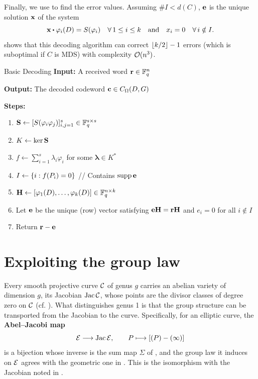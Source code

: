 \documentclass[twocolumn, 11pt]{scrartcl}
\begin{document}
Finally, we use \cite[Prop.~6.1]{o2008key} to find the error values. Assuming $\#I<d(C)$, $\mathbf{e}$ is the unique solution $\mathbf{x}$ of the system
\[ \bfx\dotpr \varphi_i(D)=S(\varphi_i)\quad\forall 1\leq i\leq k\qand x_i=0\quad\forall i\notin I. \]
\cite[Prop.~6.5]{o2008key} shows that this decoding algorithm can correct $\lfloor k/2\rfloor-1$ errors (which is suboptimal if $C$ is MDS) with complexity $\mathcal{O}(n^3)$.

\begin{algorithm}{Basic Decoding \cite[\S6.2]{hoholdt1998algebraic}}{}
    \textbf{Input:} A received word $\mathbf{r}\in\mathbb{F}_q^n$
    
    \textbf{Output:} The decoded codeword $\mathbf{c}\in C_\Omega(D,G)$
    
    \textbf{Steps:}
    
    \begin{enumerate}[label={\arabic*.}, left=0pt]
        \item $\mathbf{S}\gets[S(\varphi_i\varphi_j)]_{i,j=1}^s\in\mathbb{F}_q^{s\times s}$
        \item $K\gets\ker\mathbf{S}$ \quad
        \item $f\gets\sum_{i=1}^s \lambda_i\varphi_i$ for some $\bm\lambda\in K^*$
        \item $I\gets\{i:f(P_i)=0\}$ \quad // Contains $\operatorname{supp}\mathbf{e}$
        \item $\mathbf{H}\gets[\varphi_1(D),\hdots,\varphi_k(D)]\in\mathbb{F}_q^{n\times k}$
        \item Let $\mathbf{e}$ be the unique (row) vector satisfying $\mathbf{e}\mathbf{H}=\mathbf{r}\mathbf{H}$ and $e_i=0$ for all $i\notin I$
        \item Return $\mathbf{r}-\mathbf{e}$
    \end{enumerate}
\end{algorithm}

\section{Exploiting the group law} \label{section:group-law}

Every smooth projective curve $\mathcal{C}$ of genus $g$ carries an abelian variety of dimension $g$, its Jacobian $\operatorname{Jac}\mathcal{C}$, whose points are the divisor classes of degree zero on $\mathcal{C}$ (cf. ). What distinguishes genus 1 is that the group structure can be transported from the Jacobian to the curve. Specifically, for an elliptic curve, the \textbf{Abel--Jacobi map}
\[ \mathcal{E}\longrightarrow\operatorname{Jac}\mathcal{E}, \qquad P\longmapsto[(P)-(\infty)] \]
is a bijection whose inverse is the sum map $\Sigma$ of , and the group law it induces on $\mathcal{E}$ agrees with the geometric one in \cite[\S III.3]{silverman2009arithmetic}. This is the isomorphism with the Jacobian noted in .
\end{document}
